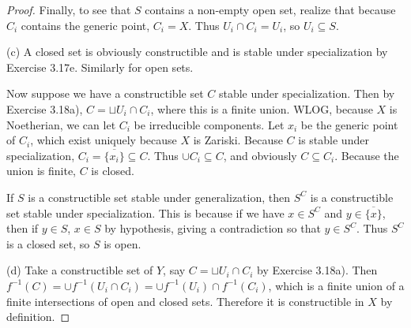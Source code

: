 \begin{proof}
	Finally, to see that $S $ contains a non-empty open set, realize that because $C_i $ contains the generic point, $C_i = X $.
	Thus $U_i\cap C_i = U_i $, so $U_i \subseteq S $.

	(c) A closed set is obviously constructible and is stable under specialization by Exercise 3.17e.
	Similarly for open sets.

	Now suppose we have a constructible set $C $ stable under specialization.
	Then by Exercise 3.18a), $C = \sqcup U_i\cap C_i $, where this is a finite union.
	WLOG, because $X $ is Noetherian, we can let $C_i $ be irreducible components.
	Let $x_i $ be the generic point of $C_i $, which exist uniquely because $X $ is Zariski.
	Because $C $ is stable under specialization, $C_i = \overline{\{x_i\}  } \subseteq C  $.
	Thus $\cup C_i \subseteq C $, and obviously $C \subseteq C_i $.
	Because the union is finite, $C $ is closed.

	If $S $ is a constructible set stable under generalization, then $S^C $ is a constructible set stable under specialization.
	This is because if we have $x\in S^C $ and $y\in \overline{\{x\} }  $, then if $y \in S $, $x\in S $ by hypothesis, giving a contradiction so that $y\in S^C $.
	Thus $S^C $ is a closed set, so $S $ is open.

	(d) Take a constructible set of $Y $, say $C = \sqcup U_i\cap C_i $ by Exercise 3.18a).
	Then $f^{-1}(C) = \cup f^{-1}(U_i\cap C_i) = \cup f^{-1}(U_i)\cap f^{-1}(C_i) $, which is a finite union of a finite intersections of open and closed sets.
	Therefore it is constructible in $X $ by definition.
\end{proof}

